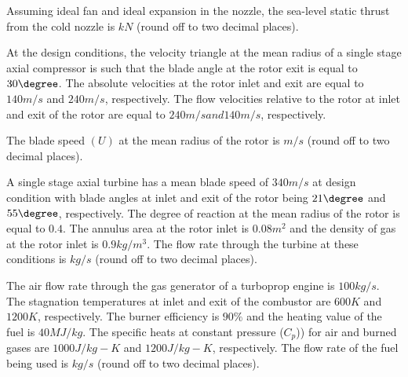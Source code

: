 Assuming ideal fan and ideal expansion in the nozzle, the sea-level static thrust from the cold nozzle is \underline{\hspace{1cm}} $kN$ (round off to two decimal places). 

    \item At the design conditions, the velocity triangle at the mean radius of a single stage axial compressor is such that the blade angle at the rotor exit is equal to $30\degree$. The absolute velocities at the rotor inlet and exit are equal to $140 m/s$ and $240 m/s$, respectively. The flow velocities relative to the rotor at inlet and exit of the rotor are equal to $240 m/s and 140 m/s$, respectively.
        \begin{figure}[!ht]
            \centering
        \end{figure}
        The blade speed $(U)$ at the mean radius of the rotor is \underline{\hspace{1cm}} $m/s$ (round off to two decimal places).

    \item A single stage axial turbine has a mean blade speed of $340 m/s$ at design condition with blade angles at inlet and exit of the rotor being $21\degree$ and $55\degree$, respectively. The degree of reaction at the mean radius of the rotor is equal to $0.4$. The annulus area at the rotor inlet is $0.08 m^2$ and the density of gas at the rotor inlet is $0.9 kg/m^3$. The flow rate through the turbine at these conditions is \underline{\hspace{1cm}} $kg/s$ (round off to two decimal places). 

    \item The air flow rate through the gas generator of a turboprop engine is $100 kg/s$. The stagnation temperatures at inlet and exit of the combustor are $600 K$ and $1200 K$, respectively. The burner efficiency is $90\%$ and the heating value of the fuel is $40 MJ/kg$. The specific heats at constant pressure ($C_{p}$)) for air and burned gases are $1000 J/kg-K$ and $1200 J/kg-K$, respectively. The flow rate of the fuel being used is \underline{\hspace{1cm}} $kg/s$ (round off to two decimal places).


